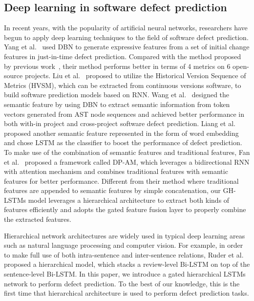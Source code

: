 \documentclass[journal]{IEEEtran}
\begin{document}
\subsection{Deep learning in software defect prediction}
In recent years, with the popularity of artificial neural networks, researchers have begun to apply deep learning techniques to the field of software defect prediction. Yang et al.~\cite{yang2015deep} used DBN to generate expressive features from a set of initial change features in just-in-time defect prediction. Compared with the method proposed by previous work~\cite{kamei2007effects}, their method performs better in terms of 4 metrics on 6 open-source projects. Liu et al.~\cite{liu2018connecting} proposed to utilize the Historical Version Sequence of Metrics (HVSM), which can be extracted from continuous versions software, to build software prediction models based on RNN. Wang et al.~\cite{wang2018deep} designed the semantic feature by using DBN to extract semantic information from token vectors generated from AST node sequences and achieved better performance in both with-in project and cross-project software defect prediction. Liang et al.~\cite{liang2019seml} proposed another semantic feature represented in the form of word embedding and chose LSTM as the classifier to boost the performance of defect prediction. To make use of the combination of semantic features and traditional features, Fan et al.~\cite{fan2019deep} proposed a framework called DP-AM, which leverages a bidirectional RNN with attention mechanism and combines traditional features with semantic features for better performance. Different from their method where traditional features are appended to semantic features by simple concatenation, our GH-LSTMs model leverages a hierarchical architecture to extract both kinds of features efficiently and adopts the gated feature fusion layer to properly combine the extracted features.


Hierarchical network architectures are widely used in typical deep learning areas such as natural language processing and computer vision. For example, in order to make full use of both intra-sentence and inter-sentence relations, Ruder et al. proposed a hierarchical model, which stacks a review-level Bi-LSTM on top of the sentence-level Bi-LSTM. In this paper, we introduce a gated hierarchical LSTMs network to perform defect prediction. To the best of our knowledge, this is the first time that hierarchical architecture is used to perform defect prediction tasks.

\end{document}
